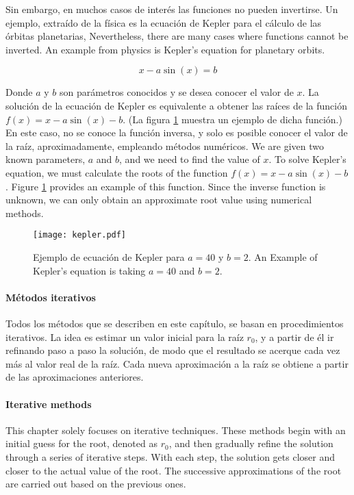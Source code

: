 \begin{paracol}{2}
Sin embargo, en muchos casos de interés las funciones no pueden invertirse.  Un ejemplo, extraído de la física es la ecuación de Kepler para el cálculo de las órbitas planetarias,
\switchcolumn
Nevertheless, there are many cases where functions cannot be inverted. An example from physics is Kepler's equation for planetary orbits.  
\end{paracol}
\begin{equation*}
x-a\sin(x)=b
\end{equation*}
\begin{paracol}{2}
Donde $a$ y $b$ son parámetros conocidos y se desea conocer el valor de $x$. La solución de la ecuación de Kepler es equivalente a obtener las raíces de la función $f(x)=x-a\sin(x)-b$. (La figura \ref{fig:kepler} muestra un ejemplo de dicha función.) En este caso, no se conoce la función inversa, y solo es posible conocer el valor de la raíz, aproximadamente, empleando métodos numéricos.
\switchcolumn
We are given two known parameters, $a$ and $b$, and we need to find the value of $x$. To solve Kepler's equation, we must calculate the roots of the function $f(x) = x - a\sin(x) - b$. Figure \ref{fig:kepler} provides an example of this function. Since the inverse function is unknown, we can only obtain an approximate root value using numerical methods.  
\end{paracol}
\begin{figure}[h]
\centering
	\texttt{[image: kepler.pdf]}
	\caption{Ejemplo de ecuación de Kepler para $a=40$ y $b=2$. An Example of Kepler's equation is taking $a=40$ and $b=2$.}
	\label{fig:kepler}
\end{figure}
\begin{paracol}{2}
\paragraph*{Métodos iterativos} 
Todos los métodos que se describen en este capítulo, se basan en procedimientos iterativos. La idea es estimar un valor inicial para la raíz $r_0$, y a partir de él ir refinando paso a paso la solución, de modo que el resultado se acerque cada vez más al valor real de la raíz. Cada nueva aproximación a la raíz se obtiene a partir de las aproximaciones anteriores.
\switchcolumn
\paragraph*{Iterative methods} This chapter solely focuses on iterative techniques. These methods begin with an initial guess for the root, denoted as $r_0$, and then gradually refine the solution through a series of iterative steps. With each step, the solution gets closer and closer to the actual value of the root. The successive approximations of the root are carried out based on the previous ones. 
\end{paracol}
